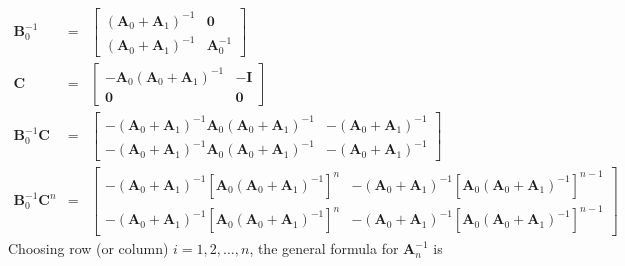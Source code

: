 \documentclass[11pt]{article}
\begin{document}
\begin{eqnarray}
\mathbf{B}_{0}^{-1} & = &\left[ \begin{array}{cc}  (\mathbf{A}_0+\mathbf{A}_1)^{-1}& \mathbf{0} \\ (\mathbf{A}_0+\mathbf{A}_1)^{-1} & \mathbf{A}_{0}^{-1}\end{array}\right] \\
\mathbf{C} & = &\left[ \begin{array}{cc}  -\mathbf{A}_0(\mathbf{A}_0+\mathbf{A}_1)^{-1}& -\mathbf{I} \\ \mathbf{0}& \mathbf{0}\end{array}\right] \\
\mathbf{B}_{0}^{-1}\mathbf{C} & = &\left[ \begin{array}{cc} -(\mathbf{A}_0+\mathbf{A}_1)^{-1}\mathbf{A}_0(\mathbf{A}_0+\mathbf{A}_1)^{-1}& -  (\mathbf{A}_0+\mathbf{A}_1)^{-1} \\  -(\mathbf{A}_0+\mathbf{A}_1)^{-1}\mathbf{A}_0(\mathbf{A}_0+\mathbf{A}_1)^{-1}& - (\mathbf{A}_0+\mathbf{A}_1)^{-1}\end{array}\right]\\
\mathbf{B}_{0}^{-1}\mathbf{C}^n & = &\left[ \begin{array}{cc} -(\mathbf{A}_0+\mathbf{A}_1)^{-1}[\mathbf{A}_0(\mathbf{A}_0+\mathbf{A}_1)^{-1}]^n& -(\mathbf{A}_0+\mathbf{A}_1)^{-1}[\mathbf{A}_0(\mathbf{A}_0+\mathbf{A}_1)^{-1}]^{n-1}\\  -(\mathbf{A}_0+\mathbf{A}_1)^{-1}[\mathbf{A}_0(\mathbf{A}_0+\mathbf{A}_1)^{-1}]^n& -(\mathbf{A}_0+\mathbf{A}_1)^{-1}[\mathbf{A}_0(\mathbf{A}_0+\mathbf{A}_1)^{-1}]^{n-1}\end{array}\right]
\end{eqnarray}
Choosing row (or column) $i = 1,2,\ldots,n$, the general formula for $\mathbf{A}_{n}^{-1}$ is
\end{document}
